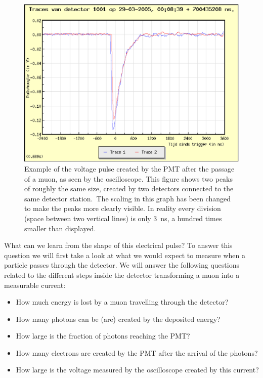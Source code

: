 \documentclass[12pt,a4paper]{article}
\numberwithin{equation}{section}
\numberwithin{figure}{section}
\numberwithin{table}{section}
\begin{document}
\begin{figure}\begin{center}
\includegraphics[scale=0.45]{scope.eps}%
\caption{Example of the voltage pulse created by the PMT after the passage of a muon, as seen by the oscilloscope. This figure shows two peaks of roughly the same size, created by two detectors connected to the same detector station.\protect\footnotemark ~The scaling in this graph has been changed to make the peaks more clearly visible. In reality every division (space between two vertical lines) is only 3~ns, a hundred times smaller than displayed.}\label{fig:scope}
\end{center}\end{figure}

What can we learn from the shape of this electrical pulse? To answer this question we will first take a look at what we would expect to measure when a particle passes through the detector. We will answer the following questions related to the different steps inside the detector transforming a muon into a measurable current:
\begin{itemize}
\item How much energy is lost by a muon travelling through the detector?
\item How many photons can be (are) created by the deposited energy?
\item How large is the fraction of photons reaching the PMT?
\item How many electrons are created by the PMT after the arrival of the photons?
\item How large is the voltage measured by the oscilloscope created by this current?
\end{itemize}
\end{document}
